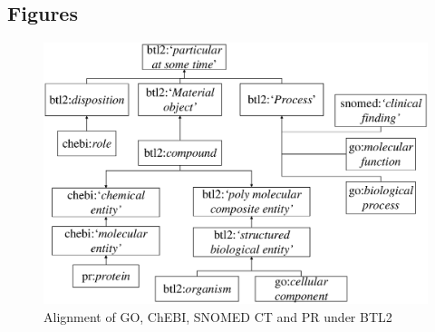 \documentclass{bmcart}
\begin{document}
\begin{backmatter}



\section*{Figures}

\begin{figure}[H]
	\centering
	\includegraphics{./PIC/HierarquiaURI}
	\caption{Alignment of GO, ChEBI, SNOMED CT and PR under BTL2} 
	\label{fig:HierarquiaURI}
\end{figure}

%



\end{backmatter}
\end{document}
